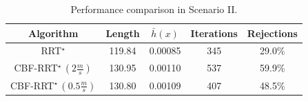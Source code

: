 \documentclass{svproc}
\begin{document}
\begin{table}[h]
\caption{Performance comparison in Scenario II.}
\begin{center}
\begin{tabular}{|c|c|c|c|c|}
    \hline
    Algorithm       & Length   & $\bar{h}(x)$    & Iterations    &   Rejections\\
    \hline
    RRT$^\star$     & 119.84    & 0.00085   & 345   & 29.0\%   \\
    \hline
    CBF-RRT$^\star\,\left(2\frac{m}{s}\right)$ & 130.95    & 0.00110   & 537   & 59.9\% \\
    \hline
    CBF-RRT$^\star\,\left(0.5\frac{m}{s}\right)$ & 130.80    & 0.00109   & 407   & 48.5\% \\
    \hline
\end{tabular}
\end{center}
\label{tab:performance_scenario_ii}
\end{table}

\end{document}

